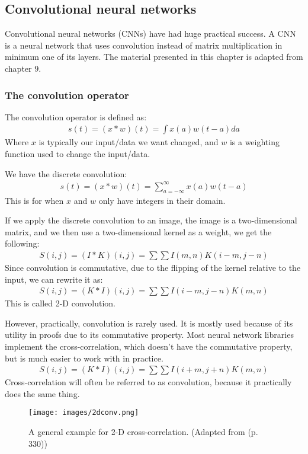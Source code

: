 \documentclass[a4paper,12pt]{article}
\begin{document}
\subsection{Convolutional neural networks}
Convolutional neural networks (CNNs) have had huge practical success. A CNN is a neural network that uses convolution instead of matrix multiplication in minimum one of its layers. The material presented in this chapter is adapted from \cite{Goodfellow-et-al-2016} chapter $9$.
\subsubsection{The convolution operator}
The convolution operator is defined as:
\begin{align}
s(t)=(x * w)(t)=\int x(a) w(t-a) d a
\end{align}
Where $x$ is typically our input/data we want changed, and $w$ is a weighting function used to change the input/data.




We have the discrete convolution:
\begin{align}
s(t)=(x * w)(t)=\sum_{a=-\infty}^{\infty} x(a) w(t-a)
\end{align}
This is for when $x$ and $w$ only have integers in their domain.




If we apply the discrete convolution to an image, the image is a two-dimensional matrix, and we then use a two-dimensional kernel as a weight, we get the following:
\begin{align}
S(i, j)=(I * K)(i, j)=\sum \sum I(m, n) K(i-m, j-n)
\end{align}
Since convolution is commutative, due to the flipping of the kernel relative to the input, we can rewrite it as:
\begin{align}
S(i, j)=(K * I)(i, j)=\sum \sum I(i-m, j-n) K(m, n)
\end{align}
This is called 2-D convolution.




However, practically, convolution is rarely used. It is mostly used because of its utility in proofs due to its commutative property.
Most neural network libraries implement the cross-correlation, which doesn't have the commutative property, but is much easier to work with in practice.
\begin{align}
S(i, j)=(K * I)(i, j)=\sum \sum I(i+m, j+n) K(m, n)
\end{align}
Cross-correlation will often be referred to as convolution, because it practically does the same thing.
\begin{figure}[H]
\centering
\texttt{[image: images/2dconv.png]}
\caption{A general example for 2-D cross-correlation. (Adapted from \cite{Goodfellow-et-al-2016} (p. 330))} %
\label{fig:n6}
\end{figure}
\end{document}
